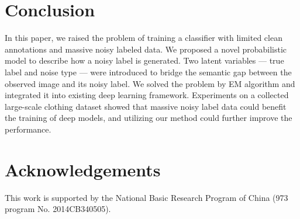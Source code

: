 \documentclass[10pt,twocolumn,letterpaper]{article}
\begin{document}
\section{Conclusion} %
\label{sec:conclusion}
In this paper, we raised the problem of training a classifier with limited clean annotations and massive noisy labeled data. We proposed a novel probabilistic model to describe how a noisy label is generated. Two latent variables --- true label and noise type --- were introduced to bridge the semantic gap between the observed image and its noisy label. We solved the problem by EM algorithm and integrated it into existing deep learning framework. Experiments on a collected large-scale clothing dataset showed that massive noisy label data could benefit the training of deep models, and utilizing our method could further improve the performance.

\section*{Acknowledgements}
\label{sec:acknowledgements}
This work is supported by the National Basic Research Program of China (973 program No. 2014CB340505).


{\small


}
\end{document}
